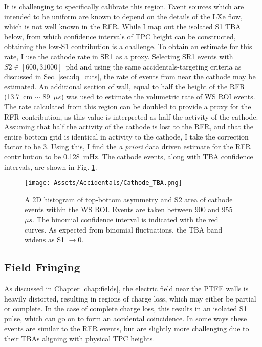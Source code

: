 It is challenging to specifically calibrate this region.
Event sources which are intended to be uniform are known to depend on the details of the LXe flow, which is not well known in the RFR.
While I map out the isolated S1 TBA below, from which confidence intervals of TPC height can be constructed, obtaining the low-S1 contribution is a challenge.
To obtain an estimate for this rate, I use the cathode rate in SR1 as a proxy.
Selecting SR1 events with $S2 \in [600, 31000]$~phd and using the same accidentals-targeting criteria as discussed in Sec. \ref{sec:dq_cuts}, the rate of events from near the cathode may be estimated.
An additional section of wall, equal to half the height of the RFR (13.7~cm $\sim$ 89~$\mu s$) was used to estimate the volumetric rate of WS ROI events.
The rate calculated from this region can be doubled to provide a proxy for the RFR contribution, as this value is interpreted as half the activity of the cathode.
Assuming that half the activity of the cathode is lost to the RFR, and that the entire bottom grid is identical in activity to the cathode, I take the correction factor to be $3$.
Using this, I find the \textit{a priori} data driven estimate for the RFR contribution to be 0.128~mHz.
The cathode events, along with TBA confidence intervals, are shown in Fig. \ref{fig:cathode_tba}.

\begin{figure}
    \centering
    \texttt{[image: Assets/Accidentals/Cathode\_TBA.png]}
    \caption[A 2D histogram of top-bottom asymmetry and S2 area of cathode events within the WS ROI.]%
    {A 2D histogram of top-bottom asymmetry and S2 area of cathode events within the WS ROI.
    Events are taken between 900 and 955 $\mu s$.
    The binomial confidence interval is indicated with the red curves.
    As expected from binomial fluctuations, the TBA band widens as S1 $\rightarrow 0$.}
    \label{fig:cathode_tba}
\end{figure}

\subsection {Field Fringing}
\label{sec:fringing}

As discussed in Chapter \ref{chap:fields}, the electric field near the PTFE walls is heavily distorted, resulting in regions of charge loss, which may either be partial or complete.
In the case of complete charge loss, this results in an isolated S1 pulse, which can go on to form an accidental coincidence.
In some ways these events are similar to the RFR events, but are slightly more challenging due to their TBAs aligning with physical TPC heights.

